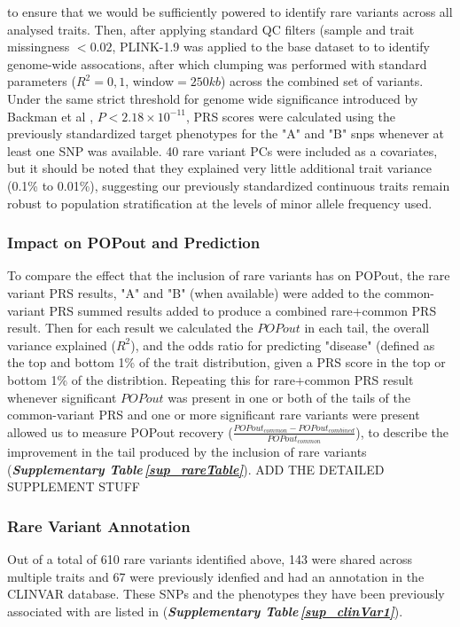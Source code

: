 \documentclass[12pt]{zHenriquesLab-StyleBioRxiv}
\newcommand\stref[1]{\normalsize{\textbf{\textit{Supplementary Table\,\ref{#1}}}}\normalsize{}}
\begin{document}
{{{to ensure that we would be sufficiently powered to identify rare variants across
all analysed traits.  Then, after applying standard QC filters (sample and trait missingness $<0.02$, 
PLINK-1.9 \cite{plink, bt_10} was applied to the base dataset
to to identify genome-wide assocations, after which clumping was performed with 
standard parameters ($R^2=0,1$, window$=250kb$) \cite{Choi2020} across the combined 
set of variants. Under the same strict threshold for genome wide significance introduced
by Backman et al \cite{Backman2021}, $P<2.18 \times 10^{-11}$, PRS scores
were calculated using the previously standardized target phenotypes for
the "A" and "B" snps whenever at least one SNP was available.  40 rare variant PCs
were included as a covariates, but it should be noted that they explained very
little additional trait variance (0.1\% to 0.01\%), suggesting our previously
standardized continuous traits remain robust to population stratification
at the levels of minor allele frequency used.

\subsubsection*{Impact on POPout and Prediction}

To compare the effect that the inclusion of rare variants has on POPout, the rare variant PRS results,
"A" and "B" (when available) were added to the common-variant PRS summed results added to produce a 
combined rare+common PRS result.  Then for each result we calculated the $POPout$ 
in each tail, the overall variance explained ($R^2$), and the odds ratio for predicting "disease" (defined 
as the top and bottom 1\% of the trait distribution, given a PRS score in the top or bottom 1\% of the 
distribtion.  Repeating this for rare+common PRS result whenever significant $POPout$ was present 
in one or both of the tails of the common-variant PRS and one or more significant rare variants 
were present allowed us to measure POPout recovery ($\frac{{POPout}_{common}-POPout_{combined}}{POPout_{common}}$), to 
describe the improvement in the tail produced by the inclusion of rare variants (\stref{sup_rareTable}). 
ADD THE DETAILED SUPPLEMENT STUFF 


\subsubsection*{Rare Variant Annotation}

Out of a total of 610 rare variants identified above, 143 were shared across multiple traits and 67 were previously 
idenfied and had an annotation in the CLINVAR database.  These SNPs and the phenotypes they have been previously 
associated with are listed in (\stref{sup_clinVar1}). 

}}}
\end{document}
